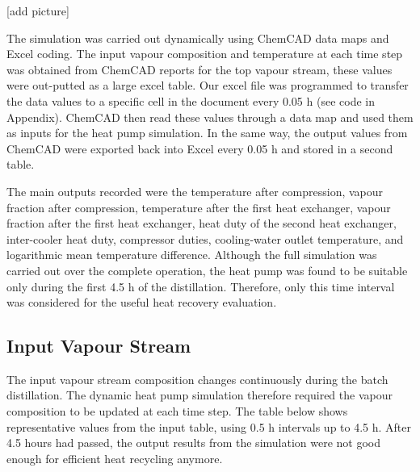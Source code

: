 {[}add picture{]}

The simulation was carried out dynamically using ChemCAD data maps and
Excel coding. The input vapour composition and temperature at each time
step was obtained from ChemCAD reports for the top vapour stream, these
values were out-putted as a large excel table. Our excel file was
programmed to transfer the data values to a specific cell in the
document every 0.05 h (see code in Appendix). ChemCAD then read these
values through a data map and used them as inputs for the heat pump
simulation. In the same way, the output values from ChemCAD were
exported back into Excel every 0.05 h and stored in a second table.

The main outputs recorded were the temperature after compression, vapour
fraction after compression, temperature after the first heat exchanger,
vapour fraction after the first heat exchanger, heat duty of the second
heat exchanger, inter-cooler heat duty, compressor duties, cooling-water
outlet temperature, and logarithmic mean temperature difference.
Although the full simulation was carried out over the complete
operation, the heat pump was found to be suitable only during the first
4.5 h of the distillation. Therefore, only this time interval was
considered for the useful heat recovery evaluation.

\subsection{Input Vapour Stream}\label{input-vapour-stream}

The input vapour stream composition changes continuously during the
batch distillation. The dynamic heat pump simulation therefore required
the vapour composition to be updated at each time step. The table below
shows representative values from the input table, using 0.5 h intervals
up to 4.5 h. After 4.5 hours had passed, the output results from the
simulation were not good enough for efficient heat recycling anymore.

